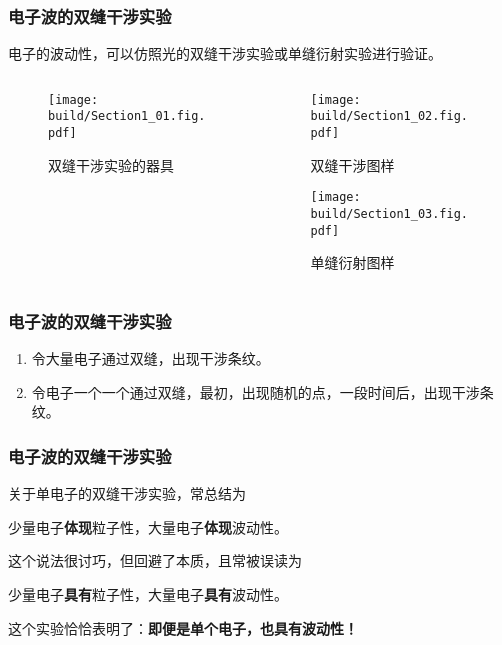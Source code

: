 \begin{frame}
    \frametitle{电子波的双缝干涉实验}
    电子的波动性，可以仿照光的双缝干涉实验或单缝衍射实验进行验证。
    \begin{columns}[t] 
        \begin{column}{6cm} 
            \begin{figure}
                \centering\texttt{[image: build/Section1\_01.fig.pdf]}
                \caption{双缝干涉实验的器具}
            \end{figure}
        \end{column}
        \begin{column}{6cm} 
            \begin{figure}
                \centering\texttt{[image: build/Section1\_02.fig.pdf]}
                \caption{双缝干涉图样}
            \end{figure}
            \begin{figure}
                \centering\texttt{[image: build/Section1\_03.fig.pdf]}
                \caption{单缝衍射图样}
            \end{figure}
        \end{column}
    \end{columns}
\end{frame}

\begin{frame}
    \frametitle{电子波的双缝干涉实验}
    \begin{enumerate}
        \item 令大量电子通过双缝，出现干涉条纹。
        \item 令电子一个一个通过双缝，最初，出现随机的点，一段时间后，出现干涉条纹。
    \end{enumerate}
\end{frame}

\begin{frame}
    \frametitle{电子波的双缝干涉实验}
    关于单电子的双缝干涉实验，常总结为
    \begin{center}
        少量电子\textbf{体现}粒子性，大量电子\textbf{体现}波动性。
    \end{center}
    这个说法很讨巧，但回避了本质，且常被误读为
    \begin{center}
        少量电子\textbf{具有}粒子性，大量电子\textbf{具有}波动性。
    \end{center}
    这个实验恰恰表明了：\textbf{即便是单个电子，也具有波动性！}
\end{frame}


